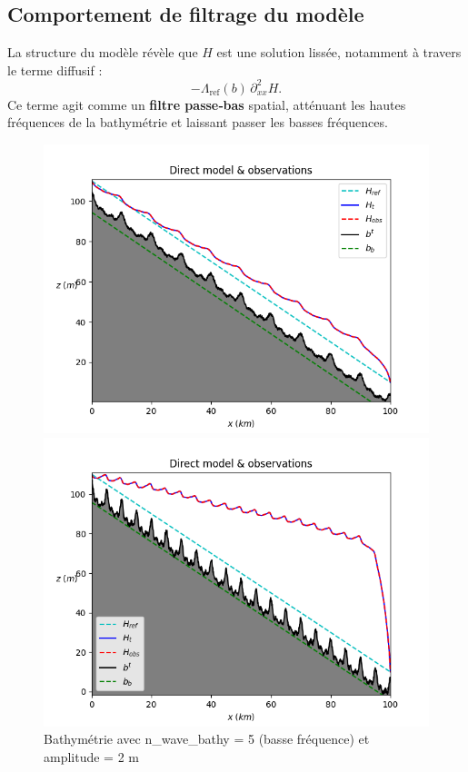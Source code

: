 \documentclass{article}
\begin{document}
\subsection{Comportement de filtrage du modèle}

La structure du modèle révèle que $H$ est une solution lissée, notamment à travers le terme diffusif :
\[
-\Lambda_{\text{ref}}(b)\,\partial_{xx}^2 H.
\]
Ce terme agit comme un \textbf{filtre passe‑bas} spatial, atténuant les hautes fréquences de la bathymétrie et laissant passer les basses fréquences.

\begin{figure}[H]
    \centering
    \begin{minipage}[b]{0.45\linewidth}
        \centering
        \includegraphics[width=\linewidth]{Images_Axel/n_wave_bathy_5.png}
        \caption{Bathymétrie avec n\_wave\_bathy = 5 (basse fréquence) et amplitude = 2 m}
        \label{fig:bathy_low}
    \end{minipage}
    \hfill
    \begin{minipage}[b]{0.45\linewidth}
        \centering
        \includegraphics[width=\linewidth]{Images_Axel/n_20_amp_3.png}

\end{minipage}
\end{figure}
\end{document}
